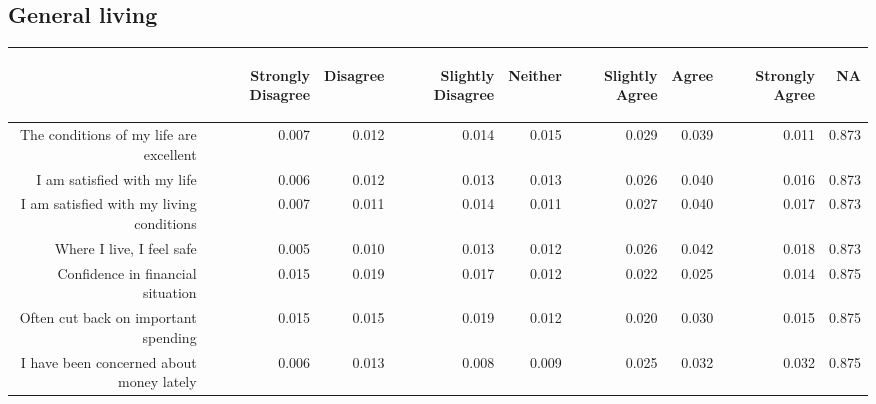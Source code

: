 \documentclass{article}\usepackage[]{graphicx}\usepackage[]{color}
\begin{document}
\subsection{General living}
\begin{table}[ht]
\centering
\begin{tabular}{rrrrrrrrr}
  \hline
 & \begin{sideways} Strongly Disagree \end{sideways} & \begin{sideways} Disagree \end{sideways} & \begin{sideways} Slightly Disagree \end{sideways} & \begin{sideways} Neither \end{sideways} & \begin{sideways} Slightly Agree \end{sideways} & \begin{sideways} Agree \end{sideways} & \begin{sideways} Strongly Agree \end{sideways} & \begin{sideways} NA \end{sideways} \\ 
  \hline
The conditions of my life are excellent & 0.007 & 0.012 & 0.014 & 0.015 & 0.029 & 0.039 & 0.011 & 0.873 \\ 
  I am satisfied with my life & 0.006 & 0.012 & 0.013 & 0.013 & 0.026 & 0.040 & 0.016 & 0.873 \\ 
  I am satisfied with my living conditions & 0.007 & 0.011 & 0.014 & 0.011 & 0.027 & 0.040 & 0.017 & 0.873 \\ 
  Where I live, I feel safe & 0.005 & 0.010 & 0.013 & 0.012 & 0.026 & 0.042 & 0.018 & 0.873 \\ 
  Confidence in financial situation & 0.015 & 0.019 & 0.017 & 0.012 & 0.022 & 0.025 & 0.014 & 0.875 \\ 
  Often cut back on important spending & 0.015 & 0.015 & 0.019 & 0.012 & 0.020 & 0.030 & 0.015 & 0.875 \\ 
  I have been concerned about money lately & 0.006 & 0.013 & 0.008 & 0.009 & 0.025 & 0.032 & 0.032 & 0.875 \\ 
   \hline
\end{tabular}
\end{table}
\end{document}
